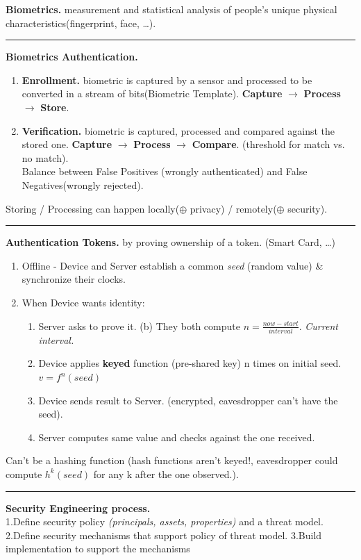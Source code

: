 \documentclass[9pt, a4paper]{extarticle}
\makeatletter
\renewcommand{\hline}{\noalign{\vskip 2px}\hrule\@height\arrayrulewidth\@width\linewidth\noalign{\vskip 2px}}
\makeatother
\begin{document}
\begin{minipage}[t]{0.495\textwidth}
	\textbf{Biometrics.} measurement and statistical analysis of people's unique physical characteristics(fingerprint, face, \ldots).
	\hline
	\textbf{Biometrics Authentication.}
	\begin{enumerate}[leftmargin=10px]
		\item \textbf{Enrollment.} biometric is captured by a sensor and processed to be converted in a stream of bits(Biometric Template). \textbf{Capture} $\rightarrow$ \textbf{Process} $\rightarrow$ \textbf{Store}.
		\item \textbf{Verification.} biometric is captured, processed and compared against the stored one. \textbf{Capture} $\rightarrow$ \textbf{Process} $\rightarrow$ \textbf{Compare}. (threshold for match vs. no match).\\ Balance between False Positives (wrongly authenticated) and False Negatives(wrongly rejected).
	\end{enumerate}
	Storing / Processing can happen locally($\oplus$ privacy) / remotely($\oplus$ security).
	\hline
	\textbf{Authentication Tokens.} by proving ownership of a token. (Smart Card, \ldots)
	\begin{enumerate}[leftmargin=10px]
		\item Offline - Device and Server establish a common \textit{seed} (random value) \& synchronize their clocks.
		\item When Device wants identity:
		      \begin{enumerate}[leftmargin=7px]
			      \item[(a)] Server asks to prove it. (b) They both compute $n=\frac{{now} - start}{interval}$. \textit{Current interval.}
			      \item[(c)] Device applies \textbf{keyed} function (pre-shared key) n times on initial seed. $v=f^n(seed)$
			      \item[(d)] Device sends result to Server. (encrypted, eavesdropper can't have the seed).
			      \item[(e)] Server computes same value and checks against the one received.
		      \end{enumerate}
	\end{enumerate}
	Can't be a hashing function (hash functions aren't keyed!, eavesdropper could compute $h^k(seed)$ for any k after the one observed.).
	\hline
	\begin{minipage}[t]{0.59\textwidth}
		\textbf{Security Engineering process.}\\
		1.Define security policy \textit{(principals, assets, properties)} and a threat model. 2.Define security mechanisms that support policy of threat model. 3.Build implementation to support the mechanisms

\end{minipage}
\end{minipage}
\end{document}
